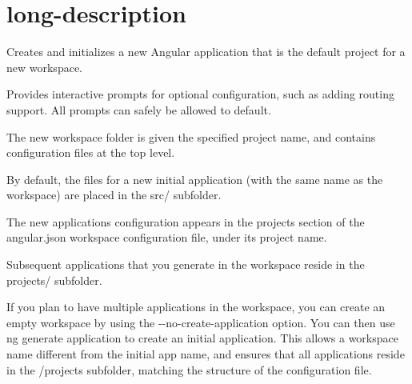 \chapter{long-\/description}
\hypertarget{md__d_1_2_g_i_t_2_food_link_2foodlink_8client_2node__modules_2_0dangular_2cli_2src_2commands_2new_2long-description}{}\label{md__d_1_2_g_i_t_2_food_link_2foodlink_8client_2node__modules_2_0dangular_2cli_2src_2commands_2new_2long-description}
Creates and initializes a new Angular application that is the default project for a new workspace.

Provides interactive prompts for optional configuration, such as adding routing support. All prompts can safely be allowed to default.


\begin{DoxyItemize}
\item The new workspace folder is given the specified project name, and contains configuration files at the top level.
\item By default, the files for a new initial application (with the same name as the workspace) are placed in the {\ttfamily src/} subfolder.
\item The new application\textquotesingle{}s configuration appears in the {\ttfamily projects} section of the {\ttfamily angular.\+json} workspace configuration file, under its project name.
\item Subsequent applications that you generate in the workspace reside in the {\ttfamily projects/} subfolder.
\end{DoxyItemize}

If you plan to have multiple applications in the workspace, you can create an empty workspace by using the {\ttfamily -\/-\/no-\/create-\/application} option. You can then use {\ttfamily ng generate application} to create an initial application. This allows a workspace name different from the initial app name, and ensures that all applications reside in the {\ttfamily /projects} subfolder, matching the structure of the configuration file. 